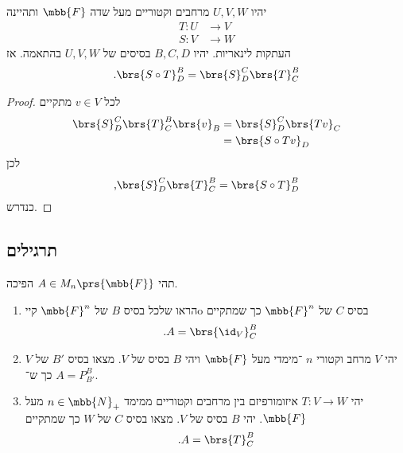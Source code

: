 \documentclass[a4paper,10pt,oneside,openany]{article}
\begin{document}
\begin{corollary} \label{corollary:representing_composition}
יהיו
$U,V,W$
מרחבים וקטוריים מעל שדה
$\mbb{F}$
ותהיינה
\begin{align*}
T \colon U &\to V \\
S \colon V &\to W
\end{align*}
העתקות לינאריות.
יהיו
$B,C,D$
בסיסים של
$U,V,W$
בהתאמה.
אז
\begin{align*}
\text{.} \brs{S \circ T}^B_D = \brs{S}^C_D \brs{T}^B_C
\end{align*}
\end{corollary}

\begin{proof}
לכל
$v \in V$
מתקיים
\begin{align*}
\brs{S}^C_D \brs{T}^B_C \brs{v}_B &= \brs{S}^C_D \brs{Tv}_C
\\&= \brs{S \circ T v}_D
\end{align*}
לכן
\[\text{,}\brs{S}^C_D \brs{T}^B_C = \brs{S \circ T}^B_D\]
כנדרש.
\end{proof}

\subsection*{תרגילים}

\begin{exercise}
תהי
$A \in M_{n}\prs{\mbb{F}}$
הפיכה.
\begin{enumerate}
\item הראו שלכל בסיס
$B$
של
$\mbb{F}^n$
קייo בסיס
$C$
של
$\mbb{F}^n$
כך שמתקיים
\begin{align*}
\text{.}A &= \brs{\id_V}^B_C
\end{align*}
\item יהי
$V$
מרחב וקטורי
$n$%
־מימדי מעל
$\mbb{F}$
ויהי
$B$
בסיס של
$V$.
מצאו בסיס
$B'$
של
$V$
כך ש־%
$A = P^B_{B'}$.
\item יהי
$T \colon V \to W$
איזומורפיזם בין מרחבים וקטוריים ממימד
$n \in \mbb{N}_+$
מעל
$\mbb{F}$.
יהי
$B$
בסיס של
$V$.
מצאו בסיס
$C$
של
$W$
כך שמתקיים
\[\text{.} A = \brs{T}^B_{C}\]
\end{enumerate}
\end{exercise}
\end{document}
